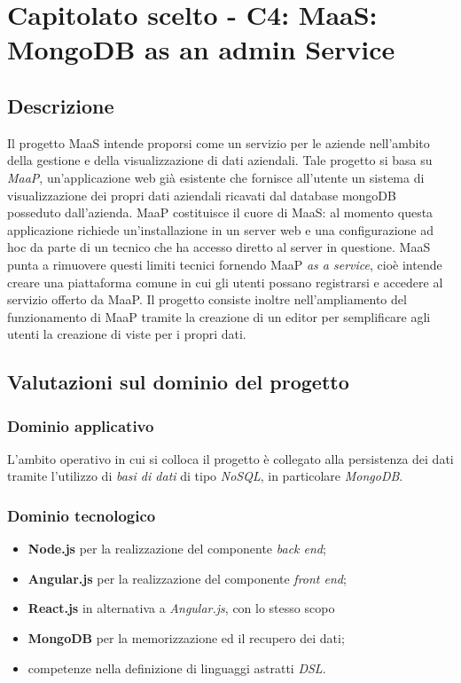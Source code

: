 \section{Capitolato scelto - C4: MaaS: MongoDB as an admin Service}
\subsection{Descrizione}
Il progetto MaaS intende proporsi come un servizio per le aziende nell'ambito della gestione e della visualizzazione di dati aziendali. 
Tale progetto si basa su \textit{MaaP}, un'applicazione web gi\`a esistente che fornisce all'utente un sistema di visualizzazione
dei propri dati aziendali ricavati dal database mongoDB posseduto dall'azienda.
MaaP costituisce il cuore di MaaS: al momento questa applicazione richiede un'installazione in un server web e 
una configurazione ad hoc da parte di un tecnico che ha accesso diretto al server in questione. MaaS punta a rimuovere 
questi limiti tecnici fornendo MaaP \textit{as a service}, cioè intende creare una piattaforma comune in cui gli utenti possano 
registrarsi e accedere al servizio offerto da MaaP. Il progetto consiste inoltre nell'ampliamento del funzionamento di MaaP tramite la creazione di 
un editor per semplificare agli utenti la creazione di viste per i propri dati.


\subsection{Valutazioni sul dominio del progetto}
\subsubsection{Dominio applicativo}
L'ambito operativo in cui si colloca il progetto \`e collegato alla persistenza dei dati tramite l'utilizzo
di \textit{basi di dati} di tipo \textit{NoSQL}, in particolare \textit{MongoDB}.

\subsubsection{Dominio tecnologico}
\begin{itemize}
\item \textbf{Node.js} per la realizzazione del componente \textit{back end};
\item \textbf{Angular.js} per la realizzazione del componente \textit{front end};
\item \textbf{React.js} in alternativa a \textit{Angular.js}, con lo stesso scopo
\item \textbf{MongoDB} per la memorizzazione ed il recupero dei dati;
\item competenze nella definizione di linguaggi astratti \textit{DSL}.
\end{itemize}



